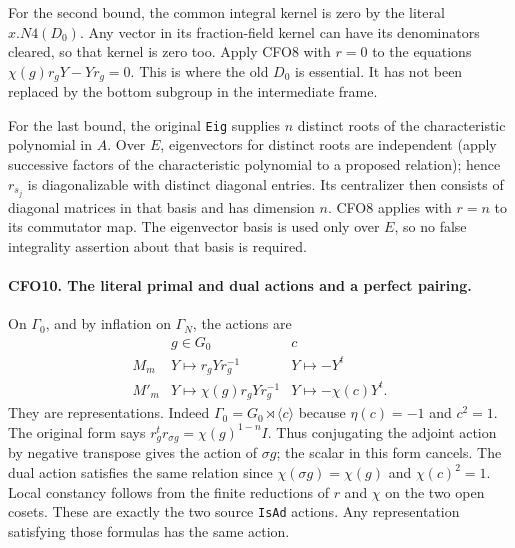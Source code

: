 For the second bound, the common integral kernel is zero by
the literal $x.N4(D_0)$.  Any vector in its fraction-field
kernel can have its denominators cleared, so that kernel is
zero too.  Apply CFO8 with $r=0$ to the equations
$\chi(g)r_gY-Yr_g=0$.  This is where the old $D_0$ is essential.
It has not been replaced by the bottom subgroup in the
intermediate frame.

For the last bound, the original \texttt{Eig} supplies $n$
distinct roots of the characteristic polynomial in $A$.
Over $E$, eigenvectors for distinct roots are independent
(apply successive factors of the characteristic polynomial
to a proposed relation); hence $r_{s_j}$ is diagonalizable
with distinct diagonal entries.  Its centralizer then
consists of diagonal matrices in that basis and has dimension
$n$.  CFO8 applies with $r=n$ to its commutator map.  The
eigenvector basis is used only over $E$, so no false
integrality assertion about that basis is required.

\paragraph{CFO10. The literal primal and dual actions and a perfect pairing.}
\label{claim:CFO10}
On $\Gamma_0$, and by inflation on $\Gamma_N$, the actions are
\[
 \begin{array}{c|cc}
       &g\in G_0&c\\ \hline
 M_m   &Y\mapsto r_gYr_g^{-1}&Y\mapsto-Y^t\\
 M'_m  &Y\mapsto\chi(g)r_gYr_g^{-1}
                         &Y\mapsto-\chi(c)Y^t .
 \end{array}                                                     \tag{CFO.18}
\]
They are representations.  Indeed $\Gamma_0=G_0\rtimes
\langle c\rangle$ because $\eta(c)=-1$ and $c^2=1$.
The original form says
$r_g^t r_{\sigma g}=\chi(g)^{1-n}I$.
Thus conjugating the adjoint action by negative transpose
gives the action of $\sigma g$; the scalar in this form
cancels.  The dual action satisfies the same relation since
$\chi(\sigma g)=\chi(g)$ and $\chi(c)^2=1$.
Local constancy follows from the finite reductions of $r$
and $\chi$ on the two open cosets.  These are exactly the
two source \texttt{IsAd} actions.  Any representation
satisfying those formulas has the same action.

